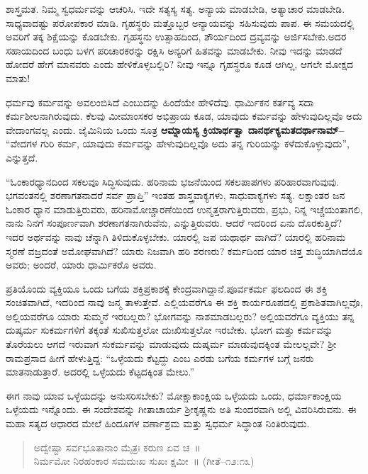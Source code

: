 ಶಾಸ್ತ್ರಮತ. ನಿಮ್ಮ ಸ್ವಧರ್ಮವನ್ನು ಆಚರಿಸಿ. ಇದೇ ಸತ್ಯಸ್ಯ ಸತ್ಯ. ಅನ್ಯಾಯ ಮಾಡಬೇಡಿ, ಅತ್ಯಾಚಾರ ಮಾಡಬೇಡಿ. ಸಾಧ್ಯವಾದಷ್ಟು ಪರೋಪಕಾರ ಮಾಡಿ. ಗೃಹಸ್ಥರು ಮತ್ತೊಬ್ಬರ ಅನ್ಯಾಯವನ್ನು ಸಹಿಸುವುದು ಪಾಪ. ಈ ಸಮಯದಲ್ಲಿ ಅವರಿಗೆ ತಕ್ಕ ಶಿಕ್ಷೆಯನ್ನು ಕೊಡಬೇಕು. ಗೃಹಸ್ಥನು ಉತ್ಸಾಹದಿಂದ, ಶೌರ್ಯದಿಂದ ದ್ರವ್ಯವನ್ನು ಅರ್ಜಿಸಬೇಕು.ಅದರ ಸಹಾಯದಿಂದ ಬಂಧು ಬಳಗ ಪರಿಚಾರಕರನ್ನು ರಕ್ಷಿಸಿ ಅನ್ಯರಿಗೆ ಹಿತವನ್ನು ಮಾಡಬೇಕು. ನೀವು ಇದನ್ನು ಮಾಡದೆ ಹೋದರೆ ಹೇಗೆ ಮಾನವರು ಎಂದು ಹೇಳಿಕೊಳ್ಳಬಲ್ಲಿರಿ? ನೀವು ಇನ್ನೂ ಗೃಹಸ್ಥರೂ ಕೂಡ ಆಗಿಲ್ಲ, ಆಗಲೇ ಮೋಕ್ಷದ ಮಾತು!

ಧರ್ಮವು ಕರ್ಮವನ್ನು ಅವಲಂಬಿಸಿದೆ ಎಂಬುದನ್ನು ಹಿಂದೆಯೇ ಹೇಳಿದೆವು. ಧಾರ್ಮಿ\break ಕನ ಕರ್ತವ್ಯ ಸದಾ ಕರ್ಮಶೀಲನಾಗಿರುವುದು. ಕೆಲವು ಮೀಮಾಂಸಕರ ಅಭಿಪ್ರಾಯ ಕೂಡ, ಯಾವುದು ಕರ್ಮವನ್ನು ಹೇಳುವುದಿಲ್ಲವೊ ಅದು ವೇದಾಂಗವಲ್ಲ ಎಂದು. ಜೈಮಿನಿಯ ಒಂದು ಸೂತ್ರ \textbf{ಆಮ್ನಾಯಸ್ಯ ಕ್ರಿಯಾರ್ಥತ್ವಾ ದಾನರ್ಥಕ್ಯಮತದರ್ಥಾನಾಮ್​–} “ವೇದಗಳ ಗುರಿ ಕರ್ಮ, ಯಾವುದು ಕರ್ಮವನ್ನು ಹೇಳುವುದಿಲ್ಲವೊ ಅದು ತನ್ನ ಗುರಿಯನ್ನು ಕಳೆದುಕೊಳ್ಳುವುದು”, ಎನ್ನುತ್ತದೆ.

“ಓಂಕಾರಧ್ಯಾನದಿಂದ ಸಕಲವೂ ಸಿದ್ಧಿಸುವುದು. ಹರಿನಾಮ ಭಜನೆಯಿಂದ ಸಕಲ\break ಪಾಪಗಳು ಪರಿಹಾರವಾಗುವುವು. ಭಗವಂತನಲ್ಲಿ ಶರಣಾಗತನಾದರೆ ಸರ್ವ ಪ್ರಾಪ್ತಿ” ಇಂತಹ ಶಾಸ್ತ್ರವಾಕ್ಯಗಳು, ಸಾಧುವಾಕ್ಯಗಳು ಸತ್ಯ. ಲಕ್ಷಾಂತರ ಜನ ಓಂಕಾರ ಧ್ಯಾನ ಮಾಡುತ್ತಿರುವರು, ಹರಿನಾಮೋಚ್ಚಾರಣೆಯಿಂದ ಉನ್ಮತ್ತರಾಗುತ್ತಿರುವರು, ಪ್ರಭು, ನಿನ್ನ ಇಚ್ಚೆಯಂತಾಗಲಿ, ನಾನು ನಿನಗೆ ಸಂಪೂರ್ಣವಾಗಿ ಶರಣಾಗತನಾಗಿರುವೆನು, ಎನ್ನುತ್ತಿರು\-ವರು. ಆದರೆ ಇದರಿಂದ ಏನು ದೊರಕುತ್ತಿದೆ? ಇದರ ಅರ್ಥವನ್ನು ನಾವು ಚೆನ್ನಾಗಿ ತಿಳಿದುಕೊಳ್ಳಬೇಕು. ಯಾರಲ್ಲಿ ಜಪ ಯಥಾರ್ಥ ವಾಗಿದೆ? ಯಾರಲ್ಲಿ ಹರಿನಾಮ ಸ್ಮರಣೆ ವಜ್ರದಂತೆ ಅಮೋಘವಾಗಿದೆ? ಯಾರು ನಿಜವಾಗಿ ಹರಿ ಶರಣರು? ಕರ್ಮದಿಂದ ಯಾರ ಚಿತ್ತ ಶುದ್ಧಿಯಾಗಿದೆಯೊ ಅವರು; ಅಂದರೆ, ಯಾರು ಧಾರ್ಮಿಕರೊ ಅವರು.

ಪ್ರತಿಯೊಂದು ವ್ಯಕ್ತಿಯೂ ಒಂದು ಬಗೆಯ ಶಕ್ತಿಪ್ರಕಾಶಕ್ಕೆ ಕೇಂದ್ರವಾಗಿದ್ದಾನೆ.\break ಪೂರ್ವಕರ್ಮ ಫಲದಿಂದ ಈ ಶಕ್ತಿ ಸಂಚಿತವಾಗಿದೆ, ಇದರಿಂದ ನಾವು ಜನ್ಮ ತಾಳುತ್ತೇವೆ. ಎಲ್ಲಿಯವರೆಗೂ ಈ ಶಕ್ತಿ ಕಾರ್ಯರೂಪದಲ್ಲಿ ಪ್ರಕಾಶಿತವಾಗಿಲ್ಲವೊ, ಅಲ್ಲಿಯವರೆಗೂ ಯಾರು ಸುಮ್ಮನೆ ಇರಬಲ್ಲರು? ಭೋಗವನ್ನು ನಾಶಮಾಡಬಲ್ಲರು? ಅಲ್ಲಿಯವರೆಗೂ ವ್ಯಕ್ತಿಯು ತನ್ನ ದುಷ್ಕರ್ಮ ಸುಕರ್ಮಗಳಿಗೆ ತಕ್ಕಂತೆ ಸುಖಿಸುತ್ತಲೋ ದುಃಖಿಸುತ್ತಲೋ ಇರಬೇಕು. ಭೋಗ ಮತ್ತು ಕರ್ಮವನ್ನು ತೊರೆಯಲು ಆಗದೆ ಇರುವಾಗ ಸುಕರ್ಮವನ್ನು ಮಾಡುವುದು ದುಷ್ಕರ್ಮ ಮಾಡುವುದಕ್ಕಿಂತ ಮೇಲಲ್ಲವೇ? ಶ‍್ರೀ ರಾಮಪ್ರಸಾದ ಹೀಗೆ ಹೇಳುತ್ತಿದ್ದ: “ಒಳ್ಳೆಯದು ಕೆಟ್ಟದ್ದು ಎಂಬ ಎರಡು ಬಗೆಯ ಕರ್ಮಗಳ ಬಗ್ಗೆ ಜನರು ಮಾತನಾಡುತ್ತಾರೆ. ಅದರಲ್ಲಿ ಒಳ್ಳೆಯದು ಕೆಟ್ಟದಕ್ಕಿಂತ ಮೇಲು.”

ಈಗ ನಾವು ಯಾವ ಒಳ್ಳೆಯದನ್ನು ಅನುಸರಿಸಬೇಕು? ಮೋಕ್ಷಾಕಾಂಕ್ಷಿಯ ಒಳ್ಳೆಯದು ಒಂದು, ಧರ್ಮಾಕಾಂಕ್ಷಿಯ ಒಳ್ಳೆಯದು ಇನ್ನೊಂದು. ಈ ಸಂದೇಶವನ್ನು ಗೀತಾಚಾರ್ಯ ಶ‍್ರೀಕೃಷ್ಣನು ಅತಿ ಸುಂದರವಾಗಿ ಅಲ್ಲಿ ವಿವರಿಸಿರುವನು. ಈ ಮಹಾ ಸತ್ಯದ ಆಧಾರದ ಮೇಲೆ ಹಿಂದೂಗಳ ವರ್ಣಾಶ್ರಮ ಮತ್ತು ಸ್ವಧರ್ಮ ಸಿದ್ಧಾಂತ ನಿಂತಿರುವುದು.

\begin{verse}
ಅದ್ವೇಷ್ಟಾ ಸರ್ವಭೂತಾನಾಂ ಮೈತ್ರಃ ಕರುಣ ಏವ ಚ~॥\\ನಿರ್ಮಮೋ ನಿರಹಂಕಾರ ಸಮದುಃಖ ಸುಖಃ ಕ್ಷಮೀ~॥ (ಗೀತೆ–೧೨:೧೩)
\end{verse}

